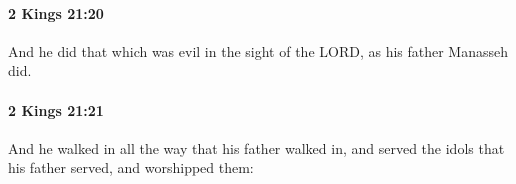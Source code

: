 		\paragraph{2 Kings 21:20} %
			\label{2KINGS-21-20}

			And he did that which was evil in the sight of the LORD, as his father Manasseh did.


		\paragraph{2 Kings 21:21} %
			\label{2KINGS-21-21}

			And he walked in all the way that his father walked in, and served the idols that his father served, and worshipped them:


